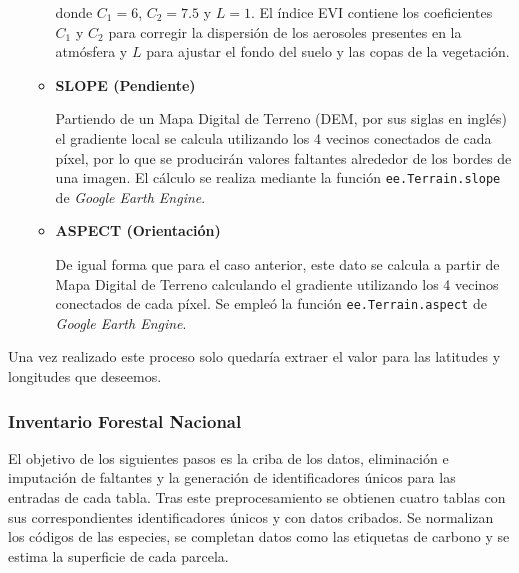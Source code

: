 \begin{itemize}
\begin{itemize}
        donde \(C_1 = 6\), \(C_2 = 7.5\) y \(L = 1\). El índice EVI contiene los coeficientes \(C_1\) y \(C_2\) para corregir la dispersión de los aerosoles presentes en la atmósfera y \(L\) para ajustar el fondo del suelo y las copas de la vegetación.
    
        \item \textbf{SLOPE (Pendiente)} \cite{ee_terrain_slope}
        
        Partiendo de un Mapa Digital de Terreno (DEM, por sus siglas en inglés) el gradiente local se calcula utilizando los 4 vecinos conectados de cada píxel, por lo que se producirán valores faltantes alrededor de los bordes de una imagen. El cálculo se realiza mediante la función \texttt{ee.Terrain.slope} de \textit{Google Earth Engine}.
    
        \item \textbf{ASPECT (Orientación)} \cite{ee_terrain_slope}
        
        De igual forma que para el caso anterior, este dato se calcula a partir de Mapa Digital de Terreno calculando el gradiente utilizando los 4 vecinos conectados de cada píxel. Se empleó la función \texttt{ee.Terrain.aspect} de \textit{Google Earth Engine}.
    \end{itemize}
\end{itemize}

Una vez realizado este proceso solo quedaría extraer el valor para las latitudes y longitudes que deseemos. 


\subsubsection{Inventario Forestal Nacional}

El objetivo de los siguientes pasos es la criba de los datos, eliminación e imputación de faltantes y la generación de identificadores únicos para las entradas de cada tabla. Tras este preprocesamiento se obtienen cuatro tablas con sus correspondientes identificadores únicos y con datos cribados. Se normalizan los códigos de las especies, se completan datos como las etiquetas de carbono y se estima la superficie de cada parcela.


